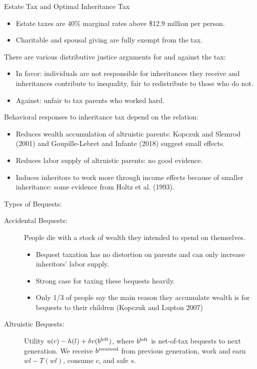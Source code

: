 \documentclass[10pt]{extarticle}
\begin{document}
  \begin{problem}{Estate Tax and Optimal Inheritance Tax}
    \begin{itemize}
      \item Estate taxes are 40\% marginal rates above \$12.9 million per person.
      \item Charitable and spousal giving are fully exempt from the tax.
    \end{itemize}
    There are various distributive justice arguments for and against the tax:
    \begin{itemize}
      \item In favor: individuals are not responsible for inheritances they receive and inheritances contribute to inequality, fair to redistribute to those who do not.
      \item Against: unfair to tax parents who worked hard.
    \end{itemize}
    Behavioral responses to inheritance tax depend on the relation:
    \begin{itemize}
      \item Reduces wealth accumulation of altruistic parents: Kopczuk and Slemrod (2001) and Goupille-Lebret and Infante (2018) suggest small effects.
      \item Reduces labor supply of altruistic parents: no good evidence.
      \item Induces inheritors to work more through income effects because of smaller inheritance: some evidence from Holtz et al. (1993).
    \end{itemize}
    Types of Bequests:
    \begin{description}
      \item[Accidental Bequests:] People die with a stock of wealth they intended to spend on themselves.
        \begin{itemize}
          \item Bequest taxation has no distortion on parents and can only increase inheritors' labor supply.
          \item Strong case for taxing these bequests heavily.
          \item Only 1/3 of people say the main reason they accumulate wealth is for bequests to their children (Kopczuk and Lupton 2007)
        \end{itemize}
      \item[Altruistic Bequests:] Utility $u(c) - h(l) + \delta v(b^{\small\text{left}})$, where $b^{\small\text{left}}$ is net-of-tax bequests to next generation. We receive $b^{\small\text{received}}$ from previous generation, work and earn $wl - T(wl)$, consume $c$, and safe $s$.\\


\end{description}
\end{problem}
\end{document}
